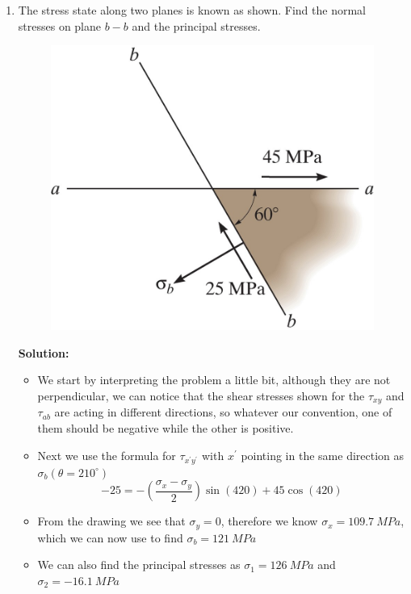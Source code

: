\documentclass[12pt, oneside]{article}
\begin{document}
\begin{enumerate}
	\item %
		The stress state along two planes is known as shown.
		Find the normal stresses on plane $b-b$ and the principal stresses.
		\begin{figure}[H]
			\centering
			\includegraphics[width=0.6\linewidth]{9-20}
		\end{figure}
			\textbf{Solution:}
			\begin{itemize}
				\item We start by interpreting the problem a little bit, although they are not perpendicular, we can notice that the shear stresses shown for the $\tau_{xy}$ and $\tau_{ab}$ are acting in different directions, so whatever our convention, one of them should be negative while the other is positive.
        \item Next we use the formula for $\tau_{x^\prime y^\prime}$ with $x^\prime$ pointing in the same direction as $\sigma_b (\theta = 210^\circ)$
          \begin{equation} 
            -25 = -\left( \frac{\sigma_x - \sigma_y}{2} \right)\sin(420) + 45 \cos(420) 
          \end{equation}
				\item From the drawing we see that $\sigma_y = 0$, therefore we know $\sigma_x = \SI{109.7}{MPa} $, which we can now use to find $\sigma_b = \SI{121 }{MPa} $ 
				\item We can also find the principal stresses as $\sigma_1 = 	\SI{126 }{MPa} $ and $\sigma_2 = 	\SI{-16.1 }{MPa} $
			\end{itemize}


\end{enumerate}
\end{document}
